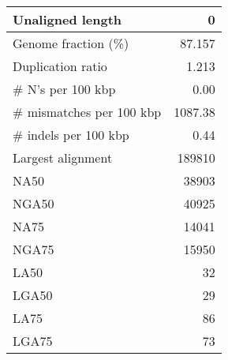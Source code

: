 \documentclass[12pt,a4paper]{article}
\begin{document}
\begin{table}[ht]
\begin{center}
\begin{tabular}{|l*{1}{|r}|}
Unaligned length & 0 \\ \hline
Genome fraction (\%) & 87.157 \\ \hline
Duplication ratio & 1.213 \\ \hline
\# N's per 100 kbp & 0.00 \\ \hline
\# mismatches per 100 kbp & 1087.38 \\ \hline
\# indels per 100 kbp & 0.44 \\ \hline
Largest alignment & 189810 \\ \hline
NA50 & 38903 \\ \hline
NGA50 & 40925 \\ \hline
NA75 & 14041 \\ \hline
NGA75 & 15950 \\ \hline
LA50 & 32 \\ \hline
LGA50 & 29 \\ \hline
LA75 & 86 \\ \hline
LGA75 & 73 \\ \hline
\end{tabular}
\end{center}
\end{table}
\end{document}
